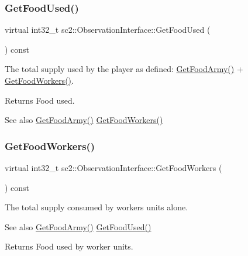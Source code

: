 \subsubsection{\texorpdfstring{Get\+Food\+Used()}{GetFoodUsed()}}
{\footnotesize\ttfamily virtual int32\+\_\+t sc2\+::\+Observation\+Interface\+::\+Get\+Food\+Used (\begin{DoxyParamCaption}{ }\end{DoxyParamCaption}) const\hspace{0.3cm}{\ttfamily [pure virtual]}}

The total supply used by the player as defined\+: \hyperlink{classsc2_1_1_observation_interface_a7fd13a2a776f08f714d941ba9e4bafa8}{Get\+Food\+Army()} + \hyperlink{classsc2_1_1_observation_interface_a19f0bdd8df647ee935dbe6f3c50d64e7}{Get\+Food\+Workers()}. \begin{DoxyReturn}{Returns}
Food used. 
\end{DoxyReturn}
\begin{DoxySeeAlso}{See also}
\hyperlink{classsc2_1_1_observation_interface_a7fd13a2a776f08f714d941ba9e4bafa8}{Get\+Food\+Army()} \hyperlink{classsc2_1_1_observation_interface_a19f0bdd8df647ee935dbe6f3c50d64e7}{Get\+Food\+Workers()} 
\end{DoxySeeAlso}
\mbox{\label{classsc2_1_1_observation_interface_a19f0bdd8df647ee935dbe6f3c50d64e7}} 
\subsubsection{\texorpdfstring{Get\+Food\+Workers()}{GetFoodWorkers()}}
{\footnotesize\ttfamily virtual int32\+\_\+t sc2\+::\+Observation\+Interface\+::\+Get\+Food\+Workers (\begin{DoxyParamCaption}{ }\end{DoxyParamCaption}) const\hspace{0.3cm}{\ttfamily [pure virtual]}}

The total supply consumed by workers units alone. \begin{DoxySeeAlso}{See also}
\hyperlink{classsc2_1_1_observation_interface_a7fd13a2a776f08f714d941ba9e4bafa8}{Get\+Food\+Army()} \hyperlink{classsc2_1_1_observation_interface_a77f230bd98b95599338c7788aee00d26}{Get\+Food\+Used()} 
\end{DoxySeeAlso}
\begin{DoxyReturn}{Returns}
Food used by worker units. 
\end{DoxyReturn}
\mbox{\label{classsc2_1_1_observation_interface_a7b73eb640b052409b0095609a8136102}} 
